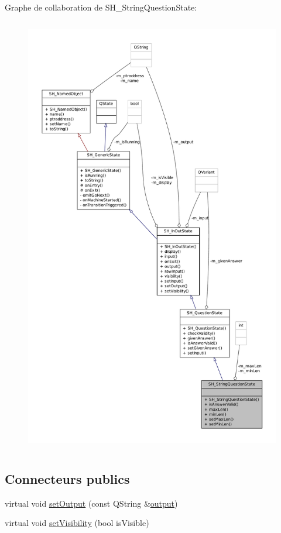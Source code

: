 Graphe de collaboration de S\-H\-\_\-\-String\-Question\-State\-:
\nopagebreak
\begin{figure}[H]
\begin{center}
\leavevmode
\includegraphics[height=550pt]{classSH__StringQuestionState__coll__graph}
\end{center}
\end{figure}
\subsection*{Connecteurs publics}
\begin{DoxyCompactItemize}
\item 
virtual void \hyperlink{classSH__InOutState_af611c84134e262739cd834797b315c80}{set\-Output} (const Q\-String \&\hyperlink{classSH__InOutState_a17ed7eaf5e3ed5af80a4f9fe65d5bfd9}{output})
\item 
virtual void \hyperlink{classSH__InOutState_a7fdfaa6f600f0ac4a96f238a038ba9ad}{set\-Visibility} (bool is\-Visible)
\end{DoxyCompactItemize}
